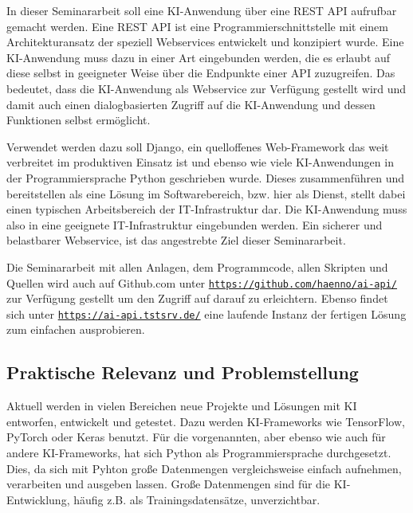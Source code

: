 \documentclass[12pt,oneside,titlepage,listof=totoc,bibliography=totoc]{scrartcl}
\newcommand{\code}[1]{\colorbox{code-gray}{\texttt{#1}}}
\begin{document}
In dieser Seminararbeit soll eine \ac{KI}-Anwendung über eine \ac{REST} \ac{API} aufrufbar gemacht werden. Eine \ac{REST} \ac{API} ist eine Programmierschnittstelle mit einem Architekturansatz der speziell Webservices entwickelt und konzipiert wurde.  Eine \ac{KI}-Anwendung muss dazu in einer Art eingebunden werden, die es erlaubt auf diese selbst in geeigneter Weise über die Endpunkte einer \ac{API} zuzugreifen. Das bedeutet, dass die \ac{KI}-Anwendung als Webservice zur Verfügung gestellt wird und damit auch einen dialogbasierten Zugriff auf die \ac{KI}-Anwendung und dessen Funktionen selbst ermöglicht. 

Verwendet werden dazu soll Django, ein quelloffenes Web-Framework das weit verbreitet im produktiven Einsatz ist und ebenso wie viele \ac{KI}-Anwendungen in der Programmiersprache Python geschrieben wurde. Dieses zusammenführen und bereitstellen als eine Lösung im Softwarebereich, bzw. hier als Dienst, stellt dabei einen typischen Arbeitsbereich der IT-Infrastruktur dar. Die \ac{KI}-Anwendung muss also in eine geeignete IT-Infrastruktur eingebunden werden. Ein sicherer und belastbarer Webservice, ist das angestrebte Ziel dieser Seminararbeit. 

Die Seminararbeit mit allen Anlagen, dem Programmcode, allen Skripten und Quellen wird auch auf Github.com unter \code{\url{https://github.com/haenno/ai-api/}} zur Verfügung gestellt um den Zugriff auf darauf zu erleichtern. Ebenso findet sich unter \code{\url{https://ai-api.tstsrv.de/}} eine laufende Instanz der fertigen Lösung zum einfachen ausprobieren. 





\subsection{Praktische Relevanz und Problemstellung}

Aktuell werden in vielen Bereichen neue Projekte und Lösungen mit \ac{KI} entworfen, entwickelt und getestet. Dazu werden \ac{KI}-Frameworks wie TensorFlow, PyTorch oder Keras benutzt. Für die vorgenannten, aber ebenso wie auch für andere \ac{KI}-Frameworks, hat sich Python als Programmiersprache durchgesetzt. Dies, da sich mit Pyhton große Datenmengen vergleichsweise einfach aufnehmen, verarbeiten und ausgeben lassen. Große Datenmengen sind für die \ac{KI}-Entwicklung, häufig z.B. als Trainingsdatensätze, unverzichtbar. 
\end{document}
